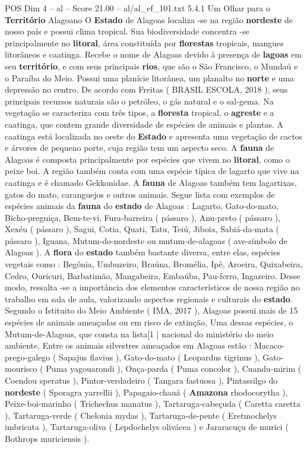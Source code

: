 \begin{textsample}{POS Dim 4 – al – Score 21.00 – al/al\_ef\_101.txt}  \label{ex:f4_pos_045}
5.4.1 Um Olhar para o \textbf{Território} Alagoano O \textbf{Estado} de Alagoas localiza -se na região \textbf{nordeste} de nosso país e possui clima tropical.
Sua biodiversidade concentra -se principalmente no \textbf{litoral}, área constituída por \textbf{florestas} tropicais, mangues litorâneos e caatinga.
Recebe o nome de Alagoas devido à presença de \textbf{lagoas} em seu \textbf{território}, e com seus principais \textbf{rios}, que são o São Francisco, o Mundaú e o Paraíba do Meio.
Possui uma planície litorânea, um planalto no \textbf{norte} e uma depressão no centro.
De acordo com Freitas ( BRASIL ESCOLA, 2018 ), seus principais recursos naturais são o petróleo, o gás natural e o sal-gema.
Na vegetação se caracteriza com três tipos, a \textbf{floresta} tropical, o \textbf{agreste} e a caatinga, que contem grande diversidade de espécies de animais e plantas.
A caatinga está localizada no oeste do \textbf{Estado} e apresenta uma vegetação de cactos e árvores de pequeno porte, cuja região tem um aspecto seco.
A \textbf{fauna} de Alagoas é composta principalmente por espécies que vivem no \textbf{litoral}, como o peixe boi.
A região também conta com uma espécie típica de lagarto que vive na caatinga e é chamado Gekkonidae.
A \textbf{fauna} de Alagoas também tem lagartixas, gatos do mato, caranguejos e outros animais.
Segue lista com exemplos de espécies animais da \textbf{fauna} do \textbf{estado} de Alagoas : Lagarto, Gato-do-mato, Bicho-preguiça, Bem-te-vi, Fura-barreira ( pássaro ), Anu-preto ( pássaro ), Xexéu ( pássaro ), Sagui, Cotia, Quati, Tatu, Teiú, Jiboia, Sabiá-da-mata ( pássaro ), Iguana, Mutum-do-nordeste ou mutum-de-alagoas ( ave-símbolo de Alagoas ).
A \textbf{flora} do \textbf{estado} também bastante diversa, entre elas, espécies vegetais como : Begônia, Umbuzeiro, Braúna, Bromélia, Ipê, Aroeira, Quixabeira, Cedro, Ouricuri, Barbatimão, Mangabeira, Embaúba, Pau-ferro, Ingazeiro.
Desse modo, ressalta -se a importância dos elementos característicos de nossa região no trabalho em sala de aula, valorizando aspectos regionais e culturais do \textbf{estado}.
Segundo o Istituito do Meio Ambiente ( IMA, 2017 ), Alagoas possui mais de 15 espécies de animais ameaçadas ou em risco de extinção, Uma dessas espécies, o Mutum-de-Alagoas, que consta na lista[1 ] nacional do ministério do meio ambiente.
Entre os animais silvestres ameaçados em Alagoas estão : Macaco-prego-galego ( Sapajus flavius ), Gato-do-mato ( Leopardus tigrinus ), Gato-mourisco ( Puma yagouarondi ), Onça-parda ( Puma concolor ), Cuandu-mirim ( Coendou speratus ), Pintor-verdadeiro ( Tangara fastuosa ), Pintassilgo do \textbf{nordeste} ( Sporagra yarrellii ), Papagaio-chauá ( \textbf{Amazona} rhodocorytha ), Peixe-boi-marinho ( Trichechus manatus ), Tartaruga-cabeçuda ( Caretta caretta ), Tartaruga-verde ( Chelonia mydas ), Tartaruga-de-pente ( Eretmochelys imbricata ), Tartaruga-oliva ( Lepdochelys olivácea ) e Jararacuçu de murici ( Bothrops muriciensis ).

\end{textsample}
